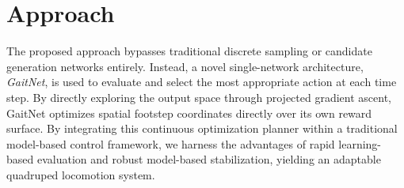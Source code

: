 \section{Approach}
\label{sec:introduction-approach}

The proposed approach bypasses traditional discrete sampling or
candidate generation networks entirely. Instead, a novel
single-network architecture, \textit{GaitNet}, is used to evaluate
and select the most appropriate action at each time step. By directly
exploring the output space through projected gradient ascent, GaitNet
optimizes spatial footstep coordinates directly over its own reward
surface. By integrating this continuous optimization planner within a
traditional model-based control framework, we harness the advantages
of rapid learning-based evaluation and robust model-based
stabilization, yielding an adaptable quadruped locomotion system.
